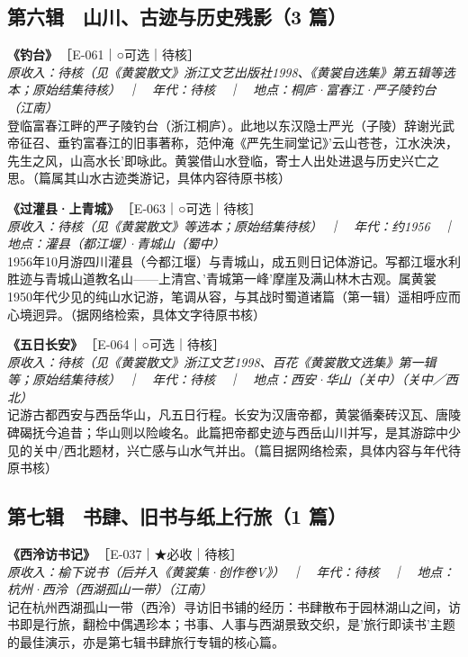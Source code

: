 \documentclass[UTF8,fontset=none,zihao=-4,a4paper]{ctexart}
\begin{document}
\subsection{第六辑　山川、古迹与历史残影（3 篇）}
\noindent\textbf{《钓台》}\,{\small ［E-061｜○可选｜待核］}\\
{\small\itshape 原收入：待核（见《黄裳散文》浙江文艺出版社1998、《黄裳自选集》第五辑等选本；原始结集待核）　｜　年代：待核　｜　地点：桐庐·富春江·严子陵钓台（江南）}\\
登临富春江畔的严子陵钓台（浙江桐庐）。此地以东汉隐士严光（子陵）辞谢光武帝征召、垂钓富春江的旧事著称，范仲淹《严先生祠堂记》'云山苍苍，江水泱泱，先生之风，山高水长'即咏此。黄裳借山水登临，寄士人出处进退与历史兴亡之思。（篇属其山水古迹类游记，具体内容待原书核）
\par\vspace{5pt}
\noindent\textbf{《过灌县·上青城》}\,{\small ［E-063｜○可选｜待核］}\\
{\small\itshape 原收入：待核（见《黄裳散文》等选本；原始结集待核）　｜　年代：约1956　｜　地点：灌县（都江堰）·青城山（蜀中）}\\
1956年10月游四川灌县（今都江堰）与青城山，成五则日记体游记。写都江堰水利胜迹与青城山道教名山——上清宫、'青城第一峰'摩崖及满山林木古观。属黄裳1950年代少见的纯山水记游，笔调从容，与其战时蜀道诸篇（第一辑）遥相呼应而心境迥异。（据网络检索，具体文字待原书核）
\par\vspace{5pt}
\noindent\textbf{《五日长安》}\,{\small ［E-064｜○可选｜待核］}\\
{\small\itshape 原收入：待核（见《黄裳散文》浙江文艺1998、百花《黄裳散文选集》第一辑等；原始结集待核）　｜　年代：待核　｜　地点：西安·华山（关中）（关中／西北）}\\
记游古都西安与西岳华山，凡五日行程。长安为汉唐帝都，黄裳循秦砖汉瓦、唐陵碑碣抚今追昔；华山则以险峻名。此篇把帝都史迹与西岳山川并写，是其游踪中少见的关中/西北题材，兴亡感与山水气并出。（篇目据网络检索，具体内容与年代待原书核）
\par\vspace{5pt}
\subsection{第七辑　书肆、旧书与纸上行旅（1 篇）}
\noindent\textbf{《西泠访书记》}\,{\small ［E-037｜★必收｜待核］}\\
{\small\itshape 原收入：榆下说书（后并入《黄裳集·创作卷V》）　｜　年代：待核　｜　地点：杭州·西泠（西湖孤山一带）（江南）}\\
记在杭州西湖孤山一带（西泠）寻访旧书铺的经历：书肆散布于园林湖山之间，访书即是行旅，翻检中偶遇珍本；书事、人事与西湖景致交织，是'旅行即读书'主题的最佳演示，亦是第七辑书肆旅行专辑的核心篇。
\par\vspace{5pt}
\end{document}
